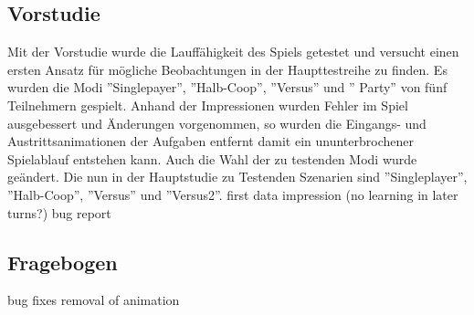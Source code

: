 \subsection{Vorstudie}
Mit der Vorstudie wurde die Lauffähigkeit des Spiels getestet und versucht einen ersten Ansatz für mögliche Beobachtungen in der Haupttestreihe zu finden. Es wurden die Modi ''Singlepayer'', ''Halb-Coop'', ''Versus'' und '' Party'' von fünf Teilnehmern gespielt. Anhand der Impressionen wurden Fehler im Spiel ausgebessert und Änderungen vorgenommen, so wurden die Eingangs- und Austrittsanimationen der Aufgaben entfernt damit ein ununterbrochener Spielablauf entstehen kann. Auch die Wahl der zu testenden Modi wurde geändert. Die nun in der Hauptstudie zu Testenden Szenarien sind  ''Singleplayer'', ''Halb-Coop'', ''Versus'' und ''Versus2''.
\newline
first data impression (no learning in later turns?)
bug report
\subsection{Fragebogen}
bug fixes\newline
removal of animation

